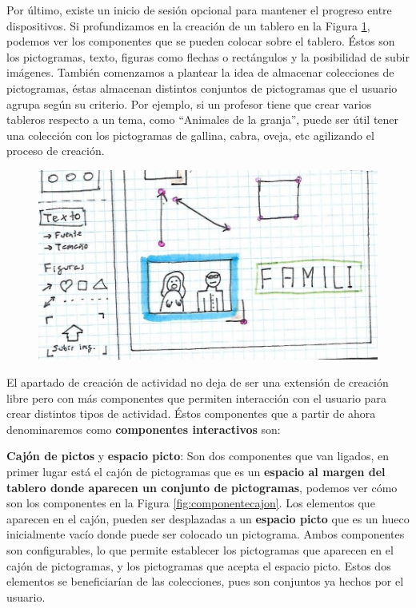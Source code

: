 Por último, existe un inicio de sesión opcional para mantener el progreso entre dispositivos. Si profundizamos en la creación de un tablero en la Figura \ref{fig:dibujolibrealfon}, podemos ver los componentes que se pueden colocar sobre el tablero. Éstos son los pictogramas, texto, figuras como flechas o rectángulos y la posibilidad de subir imágenes. También comenzamos a plantear la idea de almacenar colecciones de pictogramas, éstas almacenan distintos conjuntos de pictogramas que el usuario agrupa según su criterio. Por ejemplo, si un profesor tiene que crear varios tableros respecto a un tema, como “Animales de la granja”, puede ser útil tener una colección con los pictogramas de gallina, cabra, oveja, etc agilizando el proceso de creación.

\begin{figure}[h!]
	\centering
	\includegraphics[width=0.7\linewidth]{Imagenes/Bitmap/DibujoLibreAlfon}
	\caption{}
	\label{fig:dibujolibrealfon}
\end{figure}

El apartado de  creación de actividad no deja de ser una extensión de creación libre pero con más  componentes que permiten interacción con el usuario para crear distintos tipos de actividad. Éstos componentes que a partir de ahora denominaremos como \textbf{componentes interactivos} son:


\textbf{Cajón de pictos} y \textbf{espacio picto}: Son dos componentes que van ligados, en primer lugar está el cajón de pictogramas que es un \textbf{espacio al margen del tablero donde aparecen un conjunto de pictogramas}, podemos ver cómo son los componentes en la Figura \ref{fig:componentecajon}. Los elementos que aparecen en el cajón, pueden  ser desplazadas a un \textbf{espacio picto} que es un hueco inicialmente vacío donde puede ser colocado un pictograma. Ambos componentes son configurables, lo que permite establecer los pictogramas que aparecen en el cajón de pictogramas, y los pictogramas que acepta el espacio picto. Estos dos elementos se beneficiarían de las colecciones, pues son conjuntos ya hechos por el usuario.

